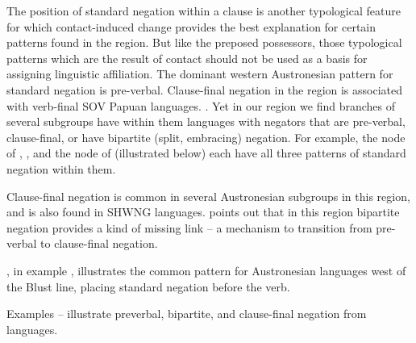 The position of standard negation within a clause is another
typological feature for which contact-induced change provides
the best explanation for certain patterns found in the region.
But like the preposed possessors,
those typological patterns which are the result of contact should
not be used as a basis for assigning linguistic affiliation.
The dominant western Austronesian pattern for standard negation is pre-verbal.
Clause-final negation in the region is associated with verb-final SOV Papuan languages.
\citep{Reesink2002b,KlamerReesinkVanStaden2008,Florey2010,Dryer2013e,ReesinkDunn2018}.
 Yet in our region we find branches of several subgroups have
within them languages with negators that are pre-verbal,
clause-final, or have bipartite (split, embracing) negation.
For example, the  node of 
\citep{Fricke2017},  \citep{Florey2010}, and the 
node of  (illustrated below) each have all three
patterns of standard negation within them.

Clause-final negation is common in several Austronesian subgroups
in this region, and is also found in SHWNG languages.
\citet{GrimesCIP} points out that in this region bipartite
negation provides a kind of missing link -- a mechanism to transition
from pre-verbal to clause-final negation.

, in example , illustrates the
common pattern for Austronesian
languages west of the Blust line,
placing standard negation before the verb.

\begin{exe}
\setcounter{xnumi}{21}
	\vspace{-1mm}
	\label{ex:02-22}
\end{exe}

Examples -- illustrate preverbal,
bipartite, and clause-final negation from 
languages.

\begin{exe}
	\vspace{-1mm}
	\vspace{-1mm}
\end{exe}

